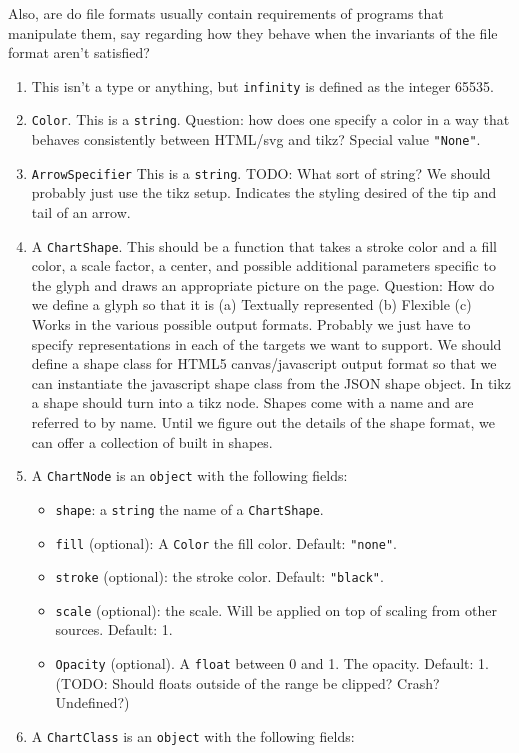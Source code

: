 \documentclass{article}
\begin{document}
Also, are do file formats usually contain requirements of programs that manipulate them, say regarding how they behave when the invariants of the file format aren't satisfied?
\begin{enumerate}
\item This isn't a type or anything, but \texttt{infinity} is defined as the integer 65535.
\item
    \texttt{Color}.
    This is a \texttt{string}.
    Question: how does one specify a color in a way that behaves consistently between HTML/svg and tikz?
    Special value \texttt{"None"}.

\item
    \texttt{ArrowSpecifier}
    This is a \texttt{string}. TODO: What sort of string?
    We should probably just use the tikz setup.
    Indicates the styling desired of the tip and tail of an arrow.

\item
    A \texttt{ChartShape}.
    This should be a function that takes a stroke color and a fill color, a scale factor, a center, and possible additional parameters specific to the glyph and draws an appropriate picture on the page.
    Question: How do we define a glyph so that it is
    (a) Textually represented
    (b) Flexible
    (c) Works in the various possible output formats.
    Probably we just have to specify representations in each of the targets we want to support.
    We should define a shape class for HTML5 canvas/javascript output format so that we can instantiate the javascript shape class from the JSON shape object.
    In tikz a shape should turn into a tikz node.
    Shapes come with a name and are referred to by name.
    Until we figure out the details of the shape format, we can offer a collection of built in shapes.

\item A \texttt{ChartNode} is an \texttt{object} with the following fields:
    \begin{itemize}
    \item    \texttt{shape}: a \texttt{string} the name of a \texttt{ChartShape}.
    \item    \texttt{fill} (optional): A \texttt{Color} the fill color. Default: \texttt{"none"}.
    \item    \texttt{stroke} (optional): the stroke color. Default: \texttt{"black"}.
    \item    \texttt{scale} (optional): the scale. Will be applied on top of scaling from other sources. Default: 1.
    \item  \texttt{Opacity} (optional). A \texttt{float} between 0 and 1. The opacity. Default: 1. (TODO: Should floats outside of the range be clipped? Crash? Undefined?)
    \end{itemize}
\item A \texttt{ChartClass} is an \texttt{object} with the following fields:


\end{enumerate}
\end{document}
